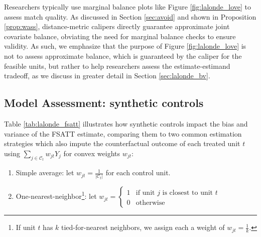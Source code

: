 \documentclass{article}
\newcommand{\Ct}{\mathcal{C}_{t}}
\begin{document}
Researchers typically use marginal balance plots like Figure \ref{fig:lalonde_love} to assess match quality.
As discussed in Section \ref{sec:avoid} and shown in Proposition \ref{prop:wass}, distance-metric calipers directly guarantee approximate joint covariate balance, obviating the need for marginal balance checks to ensure validity.
As such, we emphasize that the purpose of Figure \ref{fig:lalonde_love} is not to assess approximate balance, which is guaranteed by the caliper for the feasible units, but rather to help researchers assess the estimate-estimand tradeoff, as we discuss in greater detail in Section \ref{sec:lalonde_bv}.

\subsection{Model Assessment: synthetic controls}

Table \ref{tab:lalonde_fsatt} illustrates how synthetic controls impact the bias and variance of the FSATT estimate,
comparing them to two common estimation strategies which also impute the counterfactual outcome of each treated unit $t$ using $\sum_{j \in \Ct} w_{jt} Y_j$ for convex weights $w_{jt}$:
\begin{enumerate}
    \item Simple average: let $w_{jt} = \frac{1}{|\Ct|}$ for each control unit.
    \item One-nearest-neighbor\footnote{If unit $t$ has $k$ tied-for-nearest neighbors, we assign each a weight of $w_{jt} = \frac{1}{k}$.}: 
        let $w_{jt} = \begin{cases}
            1 & \text{if unit } j \text{ is closest to unit } t \\
            0 & \text{otherwise}
        \end{cases}$ 
\end{enumerate}
\end{document}
